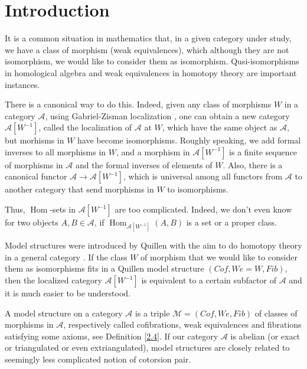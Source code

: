 \documentclass[12pt]{amsart}
\numberwithin{equation}{section}
\theoremstyle{definition}
\DeclareMathOperator{\Hom}{Hom}
\newtheorem*{theorem 0*}{Theorem}
\newtheorem*{theorem a*}{Theorem A}
\newtheorem*{theorem b*}{Theorem B}
\numberwithin{diagram}{section}
\begin{document}
	
	
	
	
	\section{Introduction}
It is a common situation in mathematics that, in a given category under study, we have a class of morphism (weak equivalences), which although they are not isomorphism, we would like to consider them as isomorphism. Qusi-isomorphisms in homological algebra and weak equivalences in homotopy theory are important instances.
    
There is a canonical way to do this. Indeed, given any class of morphisms $W$ in a category $\mathcal{A}$, using Gabriel-Zisman localization \cite{GZ}, one can obtain a new category $\mathcal{A}[W^{-1}]$, called the localization of $\mathcal{A}$ at $W$, which have the same object as $\mathcal{A}$, but morhisms in $W$ have become isomorphisms. Roughly speaking, we add formal inverses to all morphisms in $W$, and a morphism in $\mathcal{A}[W^{-1}]$ is a finite sequence of morphisms in $\mathcal{A}$ and the formal inverses of elements of $W$. Also, there is a canonical functor $\mathcal{A}\rightarrow\mathcal{A}[W^{-1}]$, which is universal among all functors from $\mathcal{A}$ to another category that send morphisms in $W$ to isomorphisms. 
    
Thus, $\Hom$-sets in $\mathcal{A}[W^{-1}]$ are too complicated.
Indeed, we don't even know for two objects $A,B\in\mathcal{A}$, if $\Hom_{\mathcal{A}[W^{-1}]}(A,B)$ is a set or a proper class.

Model structures were introduced by Quillen with the aim to do homotopy theory in a general category \cite{Q1,Q2,Q3}.
If the class $W$ of morphism that we would like to consider them as isomorphisms fits in a Quillen model structure $(Cof,We=W,Fib)$, then the localized category $\mathcal{A}[W^{-1}]$ is equivalent to a certain subfactor of $\mathcal{A}$ and it is much easier to be understood. 

A model structure on a category $\mathcal{A}$ is a triple $\mathcal{M}=(Cof,We,Fib)$ of classes of morphisms in $\mathcal{A}$, respectively called cofibrations, weak equivalences and fibrations satisfying some axioms, see Definition \ref{2.4}.
If our category $\mathcal{A}$ is abelian (or exact or triangulated or even extriangulated), model structures are closely related to seemingly less complicated notion of cotorsion pair.
\end{document}
